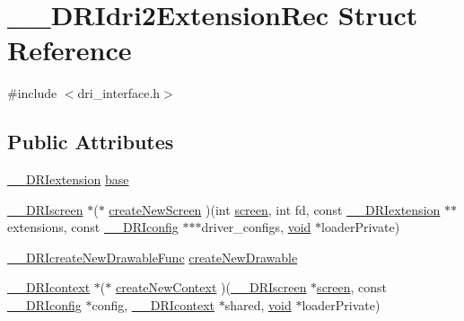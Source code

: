 \hypertarget{struct_____d_r_idri2_extension_rec}{}\section{\+\_\+\+\_\+\+D\+R\+Idri2\+Extension\+Rec Struct Reference}
\label{struct_____d_r_idri2_extension_rec}


{\ttfamily \#include $<$dri\+\_\+interface.\+h$>$}

\subsection*{Public Attributes}
\begin{DoxyCompactItemize}
\item 
\hyperlink{dri__interface_8h_a4e0a61c8ece00d2b2c6792a9a1b55385}{\+\_\+\+\_\+\+D\+R\+Iextension} \hyperlink{struct_____d_r_idri2_extension_rec_a71675244c4518f1cd35041acd4836135}{base}
\item 
\hyperlink{dri__interface_8h_a9961b01d421ee1fd6ed3c05acc9ca561}{\+\_\+\+\_\+\+D\+R\+Iscreen} $\ast$($\ast$ \hyperlink{struct_____d_r_idri2_extension_rec_ac66b0bfcd83df59d0ce66d6aa1a44a91}{create\+New\+Screen} )(int \hyperlink{cad_8h_ae04e09e4e3831bfc1632c509ae37dcec}{screen}, int fd, const \hyperlink{dri__interface_8h_a4e0a61c8ece00d2b2c6792a9a1b55385}{\+\_\+\+\_\+\+D\+R\+Iextension} $\ast$$\ast$extensions, const \hyperlink{dri__interface_8h_aeac81999efbbf8b1d6886338e3ea24d9}{\+\_\+\+\_\+\+D\+R\+Iconfig} $\ast$$\ast$$\ast$driver\+\_\+configs, \hyperlink{_s_d_l__opengles2__gl2ext_8h_ae5d8fa23ad07c48bb609509eae494c95}{void} $\ast$loader\+Private)
\item 
\hyperlink{dri__interface_8h_ac32374b98e1c97cd35c2d247455c0a57}{\+\_\+\+\_\+\+D\+R\+Icreate\+New\+Drawable\+Func} \hyperlink{struct_____d_r_idri2_extension_rec_a8ab2424cbe4598219f503e9e7dad2d04}{create\+New\+Drawable}
\item 
\hyperlink{dri__interface_8h_a3fd295cba82b5a3d79f1ee7e12bfb908}{\+\_\+\+\_\+\+D\+R\+Icontext} $\ast$($\ast$ \hyperlink{struct_____d_r_idri2_extension_rec_a887b9ee8dc23cd4b15daea66f0fd48fe}{create\+New\+Context} )(\hyperlink{dri__interface_8h_a9961b01d421ee1fd6ed3c05acc9ca561}{\+\_\+\+\_\+\+D\+R\+Iscreen} $\ast$\hyperlink{cad_8h_ae04e09e4e3831bfc1632c509ae37dcec}{screen}, const \hyperlink{dri__interface_8h_aeac81999efbbf8b1d6886338e3ea24d9}{\+\_\+\+\_\+\+D\+R\+Iconfig} $\ast$config, \hyperlink{dri__interface_8h_a3fd295cba82b5a3d79f1ee7e12bfb908}{\+\_\+\+\_\+\+D\+R\+Icontext} $\ast$shared, \hyperlink{_s_d_l__opengles2__gl2ext_8h_ae5d8fa23ad07c48bb609509eae494c95}{void} $\ast$loader\+Private)
$$
\end{DoxyCompactItemize}
